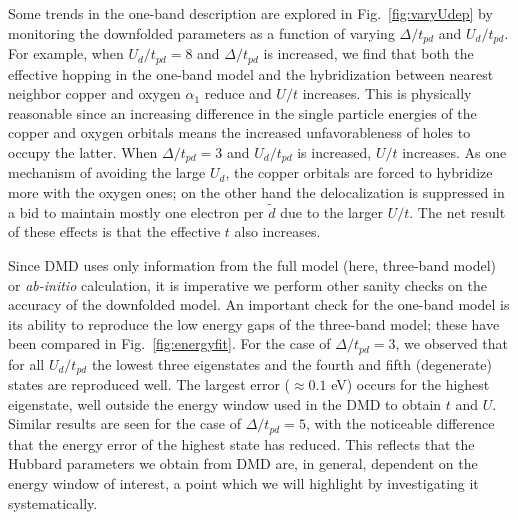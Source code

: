 Some trends in the one-band description are explored in Fig.~\ref{fig:varyUdep} 
by monitoring the downfolded parameters as a function of varying $\Delta/t_{pd}$ and $U_d/t_{pd}$. 
For example, when $U_d/t_{pd}=8$ and $\Delta/t_{pd}$ is increased, we find that both 
the effective hopping in the one-band model and the hybridization between nearest neighbor copper and oxygen $\alpha_1$ 
reduce and $U/t$ increases. This is physically reasonable since an increasing difference in the 
single particle energies of the copper and oxygen orbitals means the increased unfavorableness of holes 
to occupy the latter. When $\Delta/t_{pd}=3$ and $U_d/t_{pd}$ is increased, $U/t$ increases. 
As one mechanism of avoiding the large $U_d$, the copper orbitals are forced to hybridize more with the oxygen ones; 
on the other hand the delocalization is suppressed in a bid to maintain mostly 
one electron per $\tilde{d}$ due to the larger $U/t$. 
The net result of these effects is that the effective $t$ also increases.%

Since DMD uses only information from the full model (here, three-band model) or \textit{ab-initio} calculation, it is imperative we 
perform other sanity checks on the accuracy of the downfolded model. An important check for the one-band model is its 
ability to reproduce the low energy gaps of the three-band model; these have been compared in 
Fig.~\ref{fig:energyfit}. For the case of $\Delta/t_{pd}=3$, we observed that for all $U_d/t_{pd}$ 
the lowest three eigenstates and the fourth and fifth (degenerate) states are reproduced well. 
The largest error ($\approx 0.1 $ eV) occurs for the highest eigenstate, well outside the energy window used 
in the DMD to obtain $t$ and $U$. Similar results are seen for the case of $\Delta/t_{pd}=5$, with the 
noticeable difference that the energy error of the highest state has reduced. 
This reflects that the Hubbard parameters we obtain from DMD are, in general, dependent on the energy window of interest, a 
point which we will highlight by investigating it systematically. 

